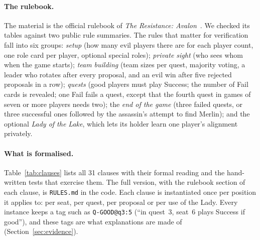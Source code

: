 \documentclass[runningheads]{llncs}
\newcommand{\cl}[1]{\texttt{#1}}
\begin{document}
\paragraph{The rulebook.}
The material is the official rulebook of \emph{The Resistance: Avalon}~\cite{eskridge2012avalon}. We checked its
tables against two public rule summaries. The rules that matter for verification fall into six groups:
\emph{setup} (how many evil players there are for each player count, one role card per player, optional special
roles); \emph{private sight} (who sees whom when the game starts); \emph{team building} (team sizes per quest,
majority voting, a leader who rotates after every proposal, and an evil win after five rejected proposals in a row);
\emph{quests} (good players must play Success; the number of Fail cards is revealed; one Fail fails a quest, except
that the fourth quest in games of seven or more players needs two); the \emph{end of the game} (three failed quests,
or three successful ones followed by the assassin's attempt to find Merlin); and the optional \emph{Lady of the Lake},
which lets its holder learn one player's alignment privately.

\paragraph{What is formalised.}
Table~\ref{tab:clauses} lists all 31 clauses with their formal reading and the hand-written tests that exercise
them. The full version, with the rulebook section of each clause, is \texttt{RULES.md} in the code.
Each clause is instantiated once per position it applies to: per seat, per quest, per proposal or per use of the
Lady. Every instance keeps a tag such as \cl{Q-GOOD@q3:5} (``in quest~3, seat~6 plays Success if good''), and these
tags are what explanations are made of (Section~\ref{sec:evidence}).
\end{document}
